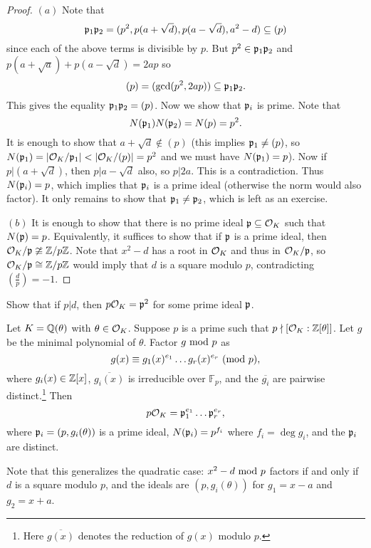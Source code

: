 \begin{proof}
  $(a)$ Note that
  \[
    \mathfrak{p}_1 \mathfrak{p}_2 = (p^2, p(a + \sqrt{d}), p(a - \sqrt{d}), a^2 - d) \subseteq (p)
  \]
  since each of the above terms is divisible by $p$.
  But $p^2 \in \mathfrak{p}_1 \mathfrak{p}_2$ and
  $p(a + \sqrt{a}) + p(a - \sqrt{d}) = 2ap$ so
  \[
    (p) = (\gcd(p^2, 2ap)) \subseteq \mathfrak{p}_1 \mathfrak{p}_2.
  \]
  This gives the equality $\mathfrak{p}_1 \mathfrak{p}_2 = (p)$. Now we
  show that $\mathfrak{p}_i$ is prime. Note that
  \[
    N(\mathfrak{p}_1) N(\mathfrak{p}_2) = N(p) = p^2.
  \]
  It is enough to show that $a + \sqrt{d} \notin (p)$
  (this implies $\mathfrak{p}_1 \ne (p)$, so
  $N(\mathfrak{p}_1) = |\mathcal{O}_K / \mathfrak{p}_1| < |\mathcal{O}_K / (p)| = p^2$ and
  we must have $N(\mathfrak{p}_1) = p$).
  Now if $p | (a + \sqrt{d})$, then
  $p | a - \sqrt{d}$ also, so $p | 2a$. This is a
  contradiction. Thus $N(\mathfrak{p}_i) = p$, which implies
  that $\mathfrak{p}_i$ is a prime ideal (otherwise the norm
  would also factor). It only remains to show that
  $\mathfrak{p}_1 \ne \mathfrak{p}_2$, which is left as an exercise.

  $(b)$ It is enough to show that there is no prime
  ideal $\mathfrak{p} \subseteq \mathcal{O}_K$ such that $N(\mathfrak{p}) = p$.
  Equivalently, it suffices to show that if $\mathfrak{p}$ is a
  prime ideal, then
  $\mathcal{O}_K / \mathfrak{p} \ncong \mathbb{Z} / p\mathbb{Z}$.  Note that $x^2 - d$
  has a root in $\mathcal{O}_K$ and thus in $\mathcal{O}_K / \mathfrak{p}$, so $\mathcal{O}_K / \mathfrak{p} \cong \mathbb{Z} / p\mathbb{Z}$ would imply that
  $d$ is a square modulo $p$, contradicting $(\frac{d}{p}) = -1$.
\end{proof}

\begin{exercise}
  Show that if $p | d$, then $p \mathcal{O}_K = \mathfrak{p}^2$ for some
  prime ideal $\mathfrak{p}$.
\end{exercise}

\begin{theorem}[Kummer]
  Let $K = \mathbb{Q}(\theta)$ with $\theta \in \mathcal{O}_K$.
  Suppose $p$ is a prime such that $p \nmid [\mathcal{O}_K : \mathbb{Z}[\theta]]$.
  Let $g$ be the minimal polynomial of $\theta$.
  Factor $g \ {\mathrm{mod}\ p}$ as
  \[
    g(x) \equiv g_1(x)^{e_1} \dots g_r(x)^{e_r} \ (\mathrm{mod}\ p),
  \]
  where $g_i(x) \in \mathbb{Z}[x]$, $\overline{g_i(x)}$ is
  irreducible over $\mathbb{F}_p$, and the
  $\overline{g_i}$ are pairwise distinct.\footnote{Here $\overline{g(x)}$ denotes the reduction of $g(x)$ modulo $p$.} Then
  \[
    p \mathcal{O}_K = \mathfrak{p}_1^{e_1} \dots \mathfrak{p}_r^{e_r},
  \]
  where $\mathfrak{p}_i = (p, g_i(\theta))$ is a prime ideal,
  $N(\mathfrak{p}_i) = p^{f_i}$ where
  $f_i = \deg g_i$, and the $\mathfrak{p}_i$ are distinct.
\end{theorem}

\begin{remark}
  Note that this generalizes the quadratic case:
  $x^2 - d \ {\mathrm{mod}\ p}$ factors if and only if $d$ is a
  square modulo $p$, and
  the ideals are $(p, g_i(\theta))$ for
  $g_1 = x - a$ and $g_2 = x + a$.
\end{remark}
